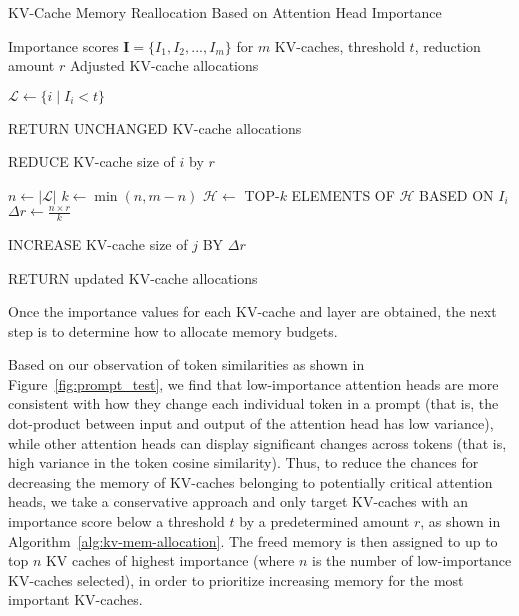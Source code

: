 \begin{algorithm}
\caption{KV-Cache Memory Reallocation Based on Attention Head Importance}
\begin{algorithmic}[1]
\REQUIRE Importance scores $\mathbf{I} = \{I_1, I_2, ..., I_m\}$ for $m$ KV-caches, threshold $t$, reduction amount $r$
\ENSURE Adjusted KV-cache allocations

\STATE $\mathcal{L} \gets \{i \mid I_i < t\}$ 

    \STATE RETURN UNCHANGED KV-cache allocations 
\ENDIF

    \STATE REDUCE KV-cache size of $i$ by $r$
\ENDFOR

\STATE $n \gets |\mathcal{L}|$ 
\STATE $k \gets \min(n, m - n)$ 
\STATE $\mathcal{H} \gets$ TOP-$k$ ELEMENTS OF $\mathcal{H}$ BASED ON $I_i$ 
\STATE $\Delta r \gets \frac{n \times r}{k}$ 

    \STATE INCREASE KV-cache size of $j$ BY $\Delta r$
\ENDFOR

\STATE RETURN updated KV-cache allocations

\end{algorithmic}
\label{alg:kv-mem-allocation}
\end{algorithm}

Once the importance values for each KV-cache and layer are obtained, the next step is to determine how to allocate memory budgets. 

Based on our observation of token similarities as shown in Figure~\ref{fig:prompt_test}, we find that low-importance attention heads are more consistent with how they change each individual token in a prompt (that is, the dot-product between input and output of the attention head has low variance), while other attention heads can display significant changes across tokens (that is, high variance in the token cosine similarity). Thus, to reduce the chances for decreasing the memory of KV-caches belonging to potentially critical attention heads, we take a conservative approach and only target KV-caches with an importance score below a threshold $t$ by a predetermined amount $r$, as shown in Algorithm~\ref{alg:kv-mem-allocation}. The freed memory is then assigned to up to top $n$ KV caches of highest importance (where $n$ is the number of low-importance KV-caches selected), in order to prioritize increasing memory for the most important KV-caches. 


